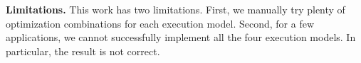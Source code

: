\vspace{0.7em}
\noindent
{\bf Limitations. }This work has two limitations. First, we manually try plenty of optimization combinations for each execution model. Second, for a few applications, we cannot successfully implement all the four execution models. In particular, the result is not correct. %










